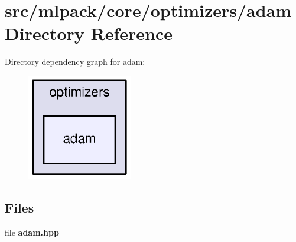 \section{src/mlpack/core/optimizers/adam Directory Reference}
\label{dir_3e726917654401abf235b4ebf3621f0a}
Directory dependency graph for adam\+:
\nopagebreak
\begin{figure}[H]
\begin{center}
\leavevmode
\includegraphics[width=130pt]{dir_3e726917654401abf235b4ebf3621f0a_dep}
\end{center}
\end{figure}
\subsection*{Files}
\begin{DoxyCompactItemize}
\item 
file {\bf adam.\+hpp}
\end{DoxyCompactItemize}
